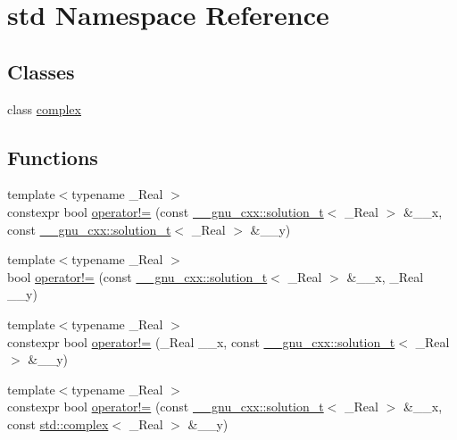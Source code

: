 \hypertarget{namespacestd}{}\section{std Namespace Reference}
\label{namespacestd}
\subsection*{Classes}
\begin{DoxyCompactItemize}
\item 
class \hyperlink{classstd_1_1complex}{complex}
\end{DoxyCompactItemize}
\subsection*{Functions}
\begin{DoxyCompactItemize}
\item 
{\footnotesize template$<$typename \+\_\+\+Real $>$ }\\constexpr bool \hyperlink{namespacestd_a0f89c0cd89caea7c7413c22c4c7e21f9}{operator!=} (const \hyperlink{namespace____gnu__cxx_ae20ea642de50eb361074c62676b0159c}{\+\_\+\+\_\+gnu\+\_\+cxx\+::solution\+\_\+t}$<$ \+\_\+\+Real $>$ \&\+\_\+\+\_\+x, const \hyperlink{namespace____gnu__cxx_ae20ea642de50eb361074c62676b0159c}{\+\_\+\+\_\+gnu\+\_\+cxx\+::solution\+\_\+t}$<$ \+\_\+\+Real $>$ \&\+\_\+\+\_\+y)
\item 
{\footnotesize template$<$typename \+\_\+\+Real $>$ }\\bool \hyperlink{namespacestd_a88548a06c4013d8e23c70a25a48a8929}{operator!=} (const \hyperlink{namespace____gnu__cxx_ae20ea642de50eb361074c62676b0159c}{\+\_\+\+\_\+gnu\+\_\+cxx\+::solution\+\_\+t}$<$ \+\_\+\+Real $>$ \&\+\_\+\+\_\+x, \+\_\+\+Real \+\_\+\+\_\+y)
\item 
{\footnotesize template$<$typename \+\_\+\+Real $>$ }\\constexpr bool \hyperlink{namespacestd_ac8ab440760f8eab57232be8417861387}{operator!=} (\+\_\+\+Real \+\_\+\+\_\+x, const \hyperlink{namespace____gnu__cxx_ae20ea642de50eb361074c62676b0159c}{\+\_\+\+\_\+gnu\+\_\+cxx\+::solution\+\_\+t}$<$ \+\_\+\+Real $>$ \&\+\_\+\+\_\+y)
\item 
{\footnotesize template$<$typename \+\_\+\+Real $>$ }\\constexpr bool \hyperlink{namespacestd_a613014e2e7afb3c131c9530988e20417}{operator!=} (const \hyperlink{namespace____gnu__cxx_ae20ea642de50eb361074c62676b0159c}{\+\_\+\+\_\+gnu\+\_\+cxx\+::solution\+\_\+t}$<$ \+\_\+\+Real $>$ \&\+\_\+\+\_\+x, const \hyperlink{classstd_1_1complex}{std\+::complex}$<$ \+\_\+\+Real $>$ \&\+\_\+\+\_\+y)

\end{DoxyCompactItemize}
